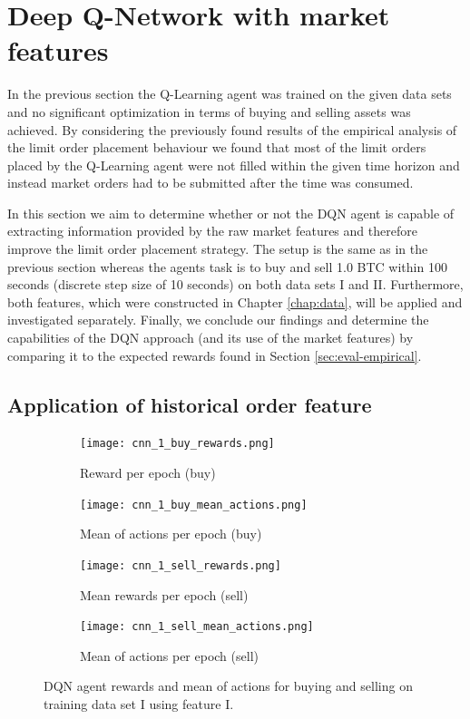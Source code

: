 \section{Deep Q-Network with market features}
\label{sec:eval-dqn}
In the previous section the Q-Learning agent was trained on the given data sets and no significant optimization in terms of buying and selling assets was achieved.
By considering the previously found results of the empirical analysis of the limit order placement behaviour we found that most of the limit orders placed by the Q-Learning agent were not filled within the given time horizon and instead market orders had to be submitted after the time was consumed.

In this section we aim to determine whether or not the DQN agent is capable of extracting information provided by the raw market features and therefore improve the limit order placement strategy.
The setup is the same as in the previous section whereas the agents task is to buy and sell 1.0 BTC within 100 seconds (discrete step size of 10 seconds) on both data sets I and II.
Furthermore, both features, which were constructed in Chapter \ref{chap:data}, will be applied and investigated separately.
Finally, we conclude our findings and determine the capabilities of the DQN approach (and its use of the market features) by comparing it to the expected rewards found in Section \ref{sec:eval-empirical}.

\subsection{Application of historical order feature}


\begin{figure}[H]
    \centering
    \begin{subfigure}[b]{0.4\textwidth}
        \texttt{[image: cnn\_1\_buy\_rewards.png]}
        \caption{Reward per epoch (buy)}
        \label{fig:analysis-dqn-1-reward-buy}
    \end{subfigure}
    \begin{subfigure}[b]{0.4\textwidth}
        \texttt{[image: cnn\_1\_buy\_mean\_actions.png]}
        \caption{Mean of actions per epoch (buy)}
        \label{fig:analysis-dqn-1-action-buy}
    \end{subfigure}
    \begin{subfigure}[b]{0.4\textwidth}
        \texttt{[image: cnn\_1\_sell\_rewards.png]}
        \caption{Mean rewards per epoch (sell)}
        \label{fig:analysis-dqn-1-reward-sell}
    \end{subfigure}
    \begin{subfigure}[b]{0.4\textwidth}
        \texttt{[image: cnn\_1\_sell\_mean\_actions.png]}
        \caption{Mean of actions per epoch (sell)}
        \label{fig:analysis-dqn-1-action-sell}
    \end{subfigure}
    \caption{DQN agent rewards and mean of actions for buying and selling on training data set I using feature I.}
    \label{fig:analysis-dqn-1}
\end{figure}

